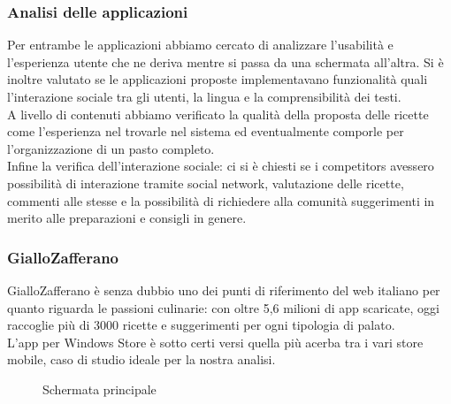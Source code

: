 \subsubsection{Analisi delle applicazioni}
Per entrambe le applicazioni abbiamo cercato di analizzare l'usabilità e l’esperienza
utente che ne deriva mentre si passa da una schermata all’altra. Si è inoltre valutato se le
applicazioni proposte implementavano funzionalità quali l’interazione sociale tra gli utenti, la
lingua e la comprensibilità dei testi.\\
A livello di contenuti abbiamo verificato la qualità della proposta delle ricette come l’esperienza nel trovarle nel sistema ed eventualmente comporle per l'organizzazione di un pasto completo.\\
Infine la verifica dell'interazione sociale: ci si è chiesti se i competitors avessero
possibilità di interazione tramite social network, valutazione delle ricette, commenti alle stesse e
la possibilità di richiedere alla comunità suggerimenti in merito alle preparazioni e consigli in
genere.
\subsubsection*{GialloZafferano}

GialloZafferano è senza dubbio uno dei punti di riferimento del web italiano per quanto riguarda le passioni culinarie: con oltre 5,6 milioni di app scaricate, oggi raccoglie più di 3000 ricette e suggerimenti per ogni tipologia di palato.\\
L'app per Windows Store è sotto certi versi quella più acerba tra i vari store mobile, caso di studio ideale per la nostra analisi.\\

\begin{figure}[h]
  \caption{Schermata principale}
  \label{fig:key}
\end{figure}

